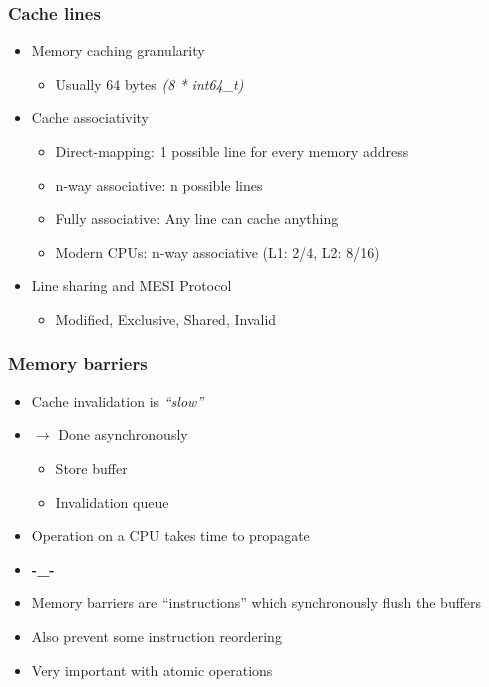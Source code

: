 \begin{frame}
  \frametitle{Cache lines}

  \begin{itemize}
  \item Memory caching granularity
    \begin{itemize}
    \item Usually 64 bytes \emph{(8 * int64\_t)}
    \end{itemize}
  \item Cache associativity
    \begin{itemize}
    \item Direct-mapping: 1 possible line for every memory address
    \item n-way associative: n possible lines
    \item Fully associative: Any line can cache anything
    \item Modern CPUs: n-way associative (L1: 2/4, L2: 8/16)
    \end{itemize}
  \item Line sharing and MESI Protocol
    \begin{itemize}
    \item Modified, Exclusive, Shared, Invalid
    \end{itemize}
  \end{itemize}
\end{frame}


\begin{frame}
  \frametitle{Memory barriers}

  \begin{itemize}
  \item Cache invalidation is \emph{``slow''}
  \item $\rightarrow$ Done asynchronously
    \begin{itemize}
    \item Store buffer
    \item Invalidation queue
    \end{itemize}
  \item Operation on a CPU takes time to propagate
  \item \textbf{-\_-}
  \item Memory barriers are ``instructions'' which synchronously flush the buffers
  \item Also prevent some instruction reordering
  \item Very important with atomic operations
  \end{itemize}
\end{frame}


